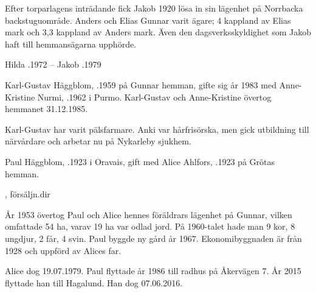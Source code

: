 Efter torparlagens inträdande fick Jakob 1920 lösa in sin lägenhet på Norrbacka backstuguområde. Anders och Elias Gunnar varit ägare; 4 kappland av Elias mark och 3,3 kappland av Anders mark. Även den dagsverksskyldighet som Jakob haft till hemmansägarna upphörde.

Hilda .1972  --  Jakob .1979




Karl-Gustav Häggblom, .1959 på Gunnar hemman, gifte sig år 1983 med Anne-Kristine Nurmi, .1962 i Purmo. Karl-Gustav och Anne-Kristine övertog hemmanet 31.12.1985.

Karl-Gustav har varit pälsfarmare. Anki var hårfrisörska, men gick utbildning till närvårdare och arbetar nu på Nykarleby sjukhem.
\begin{jhchildren}
  \item {}
  \item {}
\end{jhchildren}


Paul Häggblom, .1923 i Oravais, gift med Alice Ahlfors, .1923 på Grötas hemman.
\begin{jhchildren}
  \item {}
  \item {}, försäljn.dir
  \item {}
  \item {}
  \item {}
\end{jhchildren}
År 1953 övertog Paul och Alice hennes föräldrars lägenhet på Gunnar, vilken omfattade 54 ha, varav 19 ha var odlad jord. På 1960-talet hade man 9 kor, 8 ungdjur, 2 får, 4 svin. Paul byggde ny gård år 1967. Ekonomibyggnaden är från 1928 och uppförd av Alices far.

Alice dog 19.07.1979. Paul flyttade år 1986 till radhus på Åkervägen 7. År 2015 flyttade han till Hagalund. Han dog 07.06.2016.


